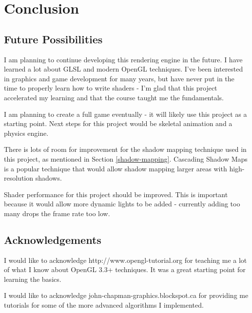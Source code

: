 \documentclass{book}
\begin{document}
  \chapter{Conclusion}
    \section{Future Possibilities}
      I am planning to continue developing this rendering engine in the future. I have learned a lot about GLSL and modern OpenGL techniques. I've been interested in graphics and game development for many years, but have never put in the time to properly learn how to write shaders - I'm glad that this project accelerated my learning and that the course taught me the fundamentals.

      I am planning to create a full game eventually - it will likely use this project as a starting point. Next steps for this project would be skeletal animation and a physics engine.

      There is lots of room for improvement for the shadow mapping technique used in this project, as mentioned in Section \ref{shadow-mapping}. Cascading Shadow Maps is a popular technique that would allow shadow mapping larger areas with high-resolution shadows.

      Shader performance for this project should be improved. This is important because it would allow more dynamic lights to be added - currently adding too many drops the frame rate too low.

  \section{Acknowledgements}
    I would like to acknowledge http://www.opengl-tutorial.org for teaching me a lot of what I know about OpenGL 3.3+ techniques. It was a great starting point for learning the basics.

    I would like to acknowledge john-chapman-graphics.blockspot.ca for providing me tutorials for some of the more advanced algorithms I implemented.


    \nocite{*}
    {}
    
\newpage


\end{document}
